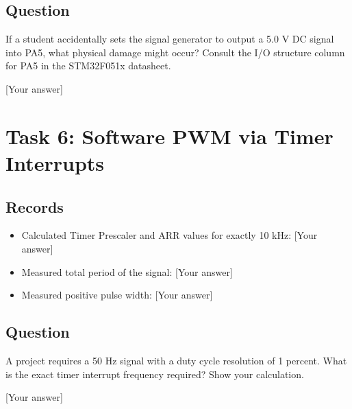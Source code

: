\documentclass[11pt]{article}
\begin{document}
\subsection{Question}
If a student accidentally sets the signal generator to output a 5.0 V DC signal into PA5, what physical damage might occur? Consult the I/O structure column for PA5 in the STM32F051x datasheet.

[Your answer]

\section{Task 6: Software PWM via Timer Interrupts}

\subsection{Records}
\begin{itemize}
    \item Calculated Timer Prescaler and ARR values for exactly 10 kHz: [Your answer]
    \item Measured total period of the signal: [Your answer]
    \item Measured positive pulse width: [Your answer]
\end{itemize}

\subsection{Question}
A project requires a 50 Hz signal with a duty cycle resolution of 1 percent. What is the exact timer interrupt frequency required? Show your calculation.

[Your answer]
\end{document}
